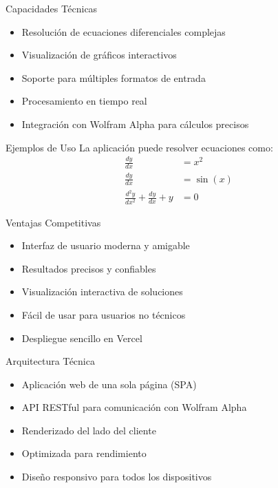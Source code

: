 \documentclass[aspectratio=169]{beamer}
\begin{document}
\begin{frame}{Capacidades Técnicas}
    \begin{itemize}
        \item Resolución de ecuaciones diferenciales complejas
        \item Visualización de gráficos interactivos
        \item Soporte para múltiples formatos de entrada
        \item Procesamiento en tiempo real
        \item Integración con Wolfram Alpha para cálculos precisos
    \end{itemize}
\end{frame}

\begin{frame}{Ejemplos de Uso}
    La aplicación puede resolver ecuaciones como:
    \begin{align*}
        \frac{dy}{dx} &= x^2 \\
        \frac{dy}{dx} &= \sin(x) \\
        \frac{d^2y}{dx^2} + \frac{dy}{dx} + y &= 0
    \end{align*}
\end{frame}

\begin{frame}{Ventajas Competitivas}
    \begin{itemize}
        \item Interfaz de usuario moderna y amigable
        \item Resultados precisos y confiables
        \item Visualización interactiva de soluciones
        \item Fácil de usar para usuarios no técnicos
        \item Despliegue sencillo en Vercel
    \end{itemize}
\end{frame}

\begin{frame}{Arquitectura Técnica}
    \begin{itemize}
        \item Aplicación web de una sola página (SPA)
        \item API RESTful para comunicación con Wolfram Alpha
        \item Renderizado del lado del cliente
        \item Optimizada para rendimiento
        \item Diseño responsivo para todos los dispositivos
    \end{itemize}
\end{frame}
\end{document}
